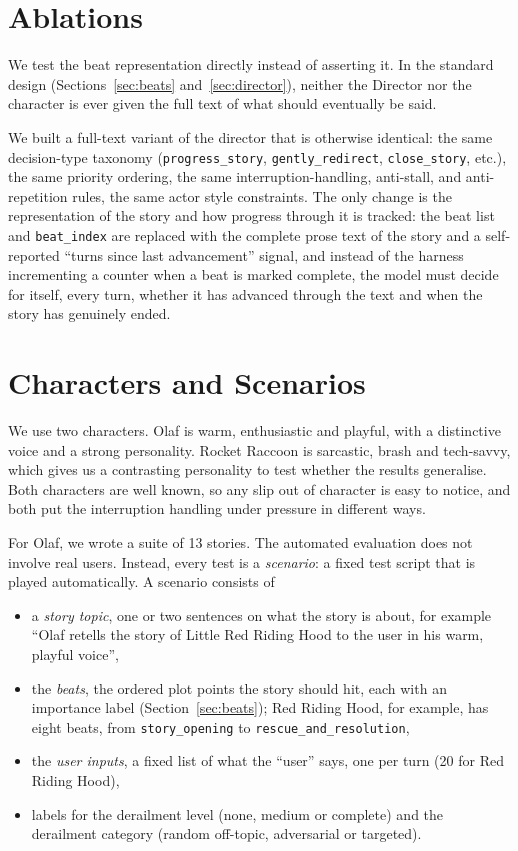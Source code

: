 \section{Ablations}\label{sec:ablations}

We test the beat representation directly instead of asserting it. In the standard design (Sections~\ref{sec:beats} and~\ref{sec:director}), neither the Director nor the character is ever given the full text of what should eventually be said.

We built a full-text variant of the director that is otherwise identical: the same decision-type taxonomy (\texttt{progress\_story}, \texttt{gently\_redirect}, \texttt{close\_story}, etc.), the same priority ordering, the same interruption-handling, anti-stall, and anti-repetition rules, the same actor style constraints. The only change is the representation of the story and how progress through it is tracked: the beat list and \texttt{beat\_index} are replaced with the complete prose text of the story and a self-reported ``turns since last advancement'' signal, and instead of the harness incrementing a counter when a beat is marked complete, the model must decide for itself, every turn, whether it has advanced through the text and when the story has genuinely ended.

\section{Characters and Scenarios}\label{sec:characters}

We use two characters. Olaf is warm, enthusiastic and playful, with a distinctive voice and a strong personality. Rocket Raccoon is sarcastic, brash and tech-savvy, which gives us a contrasting personality to test whether the results generalise. Both characters are well known, so any slip out of character is easy to notice, and both put the interruption handling under pressure in different ways.

For Olaf, we wrote a suite of 13 stories. The automated evaluation does not involve real users. Instead, every test is a \emph{scenario}: a fixed test script that is played automatically. A scenario consists of
\begin{itemize}
  \item a \textit{story topic}, one or two sentences on what the story is about, for example ``Olaf retells the story of Little Red Riding Hood to the user in his warm, playful voice'',
  \item the \textit{beats}, the ordered plot points the story should hit, each with an importance label (Section~\ref{sec:beats}); Red Riding Hood, for example, has eight beats, from \texttt{story\_opening} to \texttt{rescue\_and\_resolution},
  \item the \textit{user inputs}, a fixed list of what the ``user'' says, one per turn (20 for Red Riding Hood),
  \item labels for the derailment level (none, medium or complete) and the derailment category (random off-topic, adversarial or targeted).
\end{itemize}

